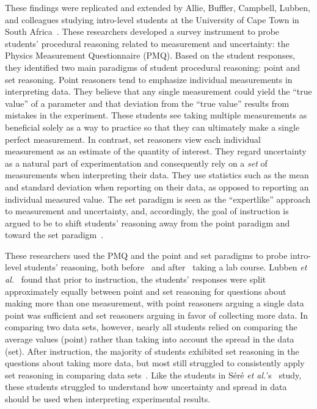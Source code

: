 \documentclass[english,aps,prstper,reprint,showpacs,longbibliography,superscriptaddress,nofootinbib]{revtex4-2}
\begin{document}
These findings were replicated and extended by Allie, Buffler, Campbell, Lubben, and colleagues studying intro-level students at the University of Cape Town in South Africa~\cite{Allie1998,Buffler2001,Lubben2001}. These researchers developed a survey instrument to probe students' procedural reasoning related to measurement and uncertainty: the Physics Measurement Questionnaire (PMQ). Based on the student responses, they identified two main paradigms of student procedural reasoning: point and set reasoning. Point reasoners tend to emphasize individual measurements in interpreting data. They believe that any single measurement could yield the ``true value'' of a parameter and that deviation from the ``true value'' results from mistakes in the experiment. These students see taking multiple measurements as beneficial solely as a way to practice so that they can ultimately make a single perfect measurement. In contrast, set reasoners view each individual measurement as an estimate of the quantity of interest. They regard uncertainty as a natural part of experimentation and consequently rely on a \textit{set} of measurements when interpreting their data. They use statistics such as the mean and standard deviation when reporting on their data, as opposed to reporting an individual measured value. The set paradigm is seen as the ``expertlike'' approach to measurement and uncertainty, and, accordingly, the goal of instruction is argued to be to shift students' reasoning away from the point paradigm and toward the set paradigm~\cite{Lubben2001,Buffler2001}.

These researchers used the PMQ and the point and set paradigms to probe intro-level students' reasoning, both before~\cite{Lubben2001} and after~\cite{Buffler2001} taking a lab course. Lubben \textit{et al.}~\cite{Lubben2001} found that prior to instruction, the students' responses were split approximately equally between point and set reasoning for questions about making more than one measurement, with point reasoners arguing a single data point was sufficient and set reasoners arguing in favor of collecting more data. In comparing two data sets, however, nearly all students relied on comparing the average values (point) rather than taking into account the spread in the data (set). After instruction, the majority of students exhibited set reasoning in the questions about taking more data, but most still struggled to consistently apply set reasoning in comparing data sets~\cite{Buffler2001}. Like the students in S\'{e}r\'{e} \textit{et al.}'s~\cite{Sere1993} study, these students struggled to understand how uncertainty and spread in data should be used when interpreting experimental results.
\end{document}
